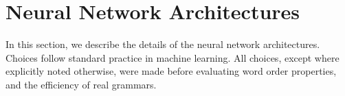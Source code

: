 \documentclass[10pt,twoside,lineno]{article}
\begin{document}







\section{Neural Network Architectures}\label{sec:neural-architectures}

In this section, we describe the details of the neural network architectures.
Choices follow standard practice in machine learning.
All choices, except where explicitly noted otherwise, were made before evaluating word order properties, and the efficiency of real grammars.

\end{document}
